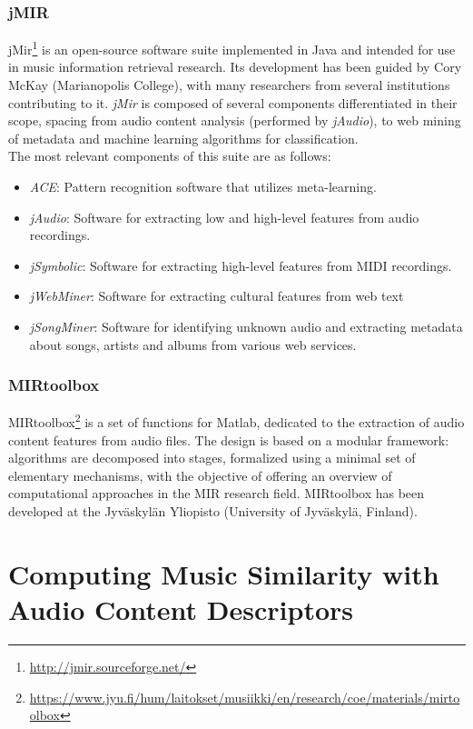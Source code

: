 \subsubsection*{jMIR}
jMir\footnote{\url{http://jmir.sourceforge.net/}} is an open-source software suite implemented in Java and intended for use in music information retrieval research. Its development has been guided by Cory McKay (Marianopolis College), with many researchers from several institutions contributing to it. \textit{jMir} is composed of several components differentiated in their scope, spacing from audio content analysis (performed by \textit{jAudio}), to web mining of metadata and machine learning algorithms for classification. \\ The most relevant components of this suite are as follows:
\begin{itemize}
\item \textit{ACE}: Pattern recognition software that utilizes meta-learning. 
\item \textit{jAudio}: Software for extracting low and high-level features from audio recordings.
\item \textit{jSymbolic}: Software for extracting high-level features from MIDI recordings.
\item \textit{jWebMiner}: Software for extracting cultural features from web text
\item \textit{jSongMiner}: Software for identifying unknown audio and extracting metadata about songs, artists and albums from various web services.
\end{itemize}


\subsubsection*{MIRtoolbox}
MIRtoolbox\footnote{\url{https://www.jyu.fi/hum/laitokset/musiikki/en/research/coe/materials/mirtoolbox}} is a set of functions for Matlab, dedicated to the extraction of audio content features from audio files. The design is based on a modular framework: algorithms are decomposed into stages, formalized using a minimal set of elementary mechanisms, with the objective of offering an overview of computational approaches in the MIR research field. MIRtoolbox has been developed at the Jyväskylän Yliopisto (University of Jyväskylä, Finland). 


\section{Computing Music Similarity with Audio Content Descriptors}


